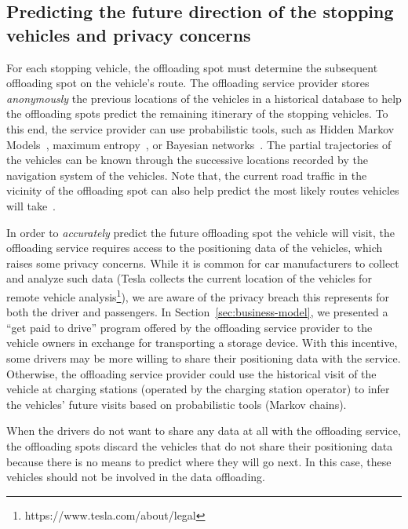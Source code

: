 \subsection{Predicting the future direction of the stopping vehicles and privacy concerns}

For each stopping vehicle, the offloading spot must determine the subsequent offloading spot on the vehicle's route. The offloading service provider stores \textit{anonymously} the previous locations of the vehicles in a historical database to help the offloading spots predict the remaining itinerary of the stopping vehicles. To this end, the service provider can use probabilistic tools, such as Hidden Markov Models~\cite{simmons2006learning}, maximum entropy~\cite{ziebart2008maximum}, or Bayesian networks~\cite{liao2007learning,krumm2006predestination}. The partial trajectories of the vehicles can be known through the successive locations recorded by the navigation system of the vehicles. Note that, the current road traffic in the vicinity of the offloading spot can also help predict the most likely routes vehicles will take~\cite{xue2009traffic}. 

In order to \textit{accurately} predict the future offloading spot the vehicle will visit, the offloading service requires access to the positioning data of the vehicles, which raises some privacy concerns. While it is common for car manufacturers to collect and analyze such data (\eg Tesla collects the current location of the vehicles for remote vehicle analysis\footnote{https://www.tesla.com/about/legal}), we are aware of the privacy breach this represents for both the driver and passengers. In Section~\ref{sec:business-model}, we presented a ``get paid to drive'' program offered by the offloading service provider to the vehicle owners in exchange for transporting a storage device. With this incentive, some drivers may be more willing to share their positioning data with the service.  Otherwise, the offloading service provider could use the historical visit of the vehicle at charging stations (operated by the charging station operator) to infer the vehicles' future visits based on probabilistic tools (\eg Markov chains).

When the drivers do not want to share any data at all with the offloading service, the offloading spots discard the vehicles that do not share their positioning data because there is no means to predict where they will go next. In this case, these vehicles should not be involved in the data offloading.

